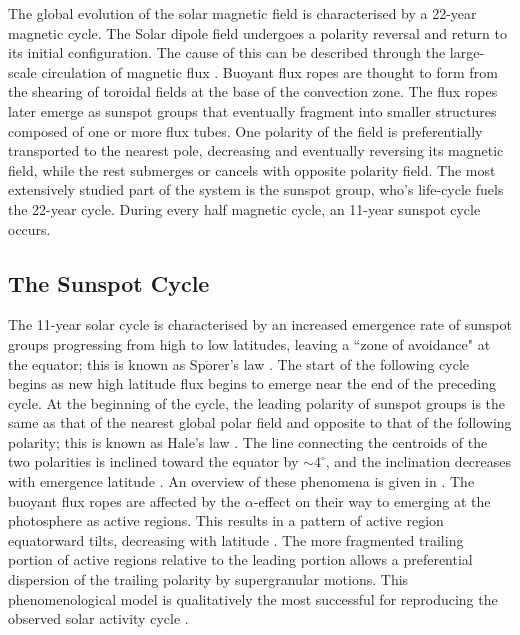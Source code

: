 The global evolution of the solar magnetic field is characterised by a 22-year magnetic cycle. The Solar dipole field undergoes a polarity reversal and return to its initial configuration. The cause of this can be described through the large-scale circulation of magnetic flux \citep{Babcock:1961, Leighton:1964}. Buoyant flux ropes are thought to form from the shearing of toroidal fields at the base of the convection zone. The flux ropes later emerge as sunspot groups that eventually fragment into smaller structures composed of one or more flux tubes. One polarity of the field is preferentially transported to the nearest pole, decreasing and eventually reversing its magnetic field, while the rest submerges or cancels with opposite polarity field. The most extensively studied part of the system is the sunspot group, who's life-cycle fuels the 22-year cycle. During every half magnetic cycle, an 11-year sunspot cycle occurs.

\subsection{The Sunspot Cycle}\label{section:sscycle}

The 11-year solar cycle is characterised by an increased emergence rate of sunspot groups progressing from high to low latitudes, leaving a ``zone of avoidance" at the equator; this is known as Sp$\ddot{\mbox{o}}$rer's law \citep{Maunder:1904}. The start of the following cycle begins as new high latitude flux begins to emerge near the end of the preceding cycle. At the beginning of the cycle, the leading polarity of sunspot groups is the same as that of the nearest global polar field and opposite to that of the following polarity; this is known as Hale's law \citep{Hale:1919}. The line connecting the centroids of the two polarities is inclined toward the equator \citep[``Joy's Law";][]{Hale:1919} by $\sim$$4^\circ$, and the inclination decreases with emergence latitude \citep{Howard:1991}. An overview of these phenomena is given in \citet{Hathaway:2010b}. The buoyant flux ropes are affected by the $\alpha$-effect \citep[as a result of the Coriolis effect;][and references therein]{Fan:2009} on their way to emerging at the photosphere as active regions. This results in a pattern of active region equatorward tilts, decreasing with latitude \citep{Howard:1991}. The more fragmented trailing portion of active regions relative to the leading portion allows a preferential dispersion of the trailing polarity by supergranular motions. This phenomenological model is qualitatively the most successful for reproducing the observed solar activity cycle \citep{Nandy:2001}.

